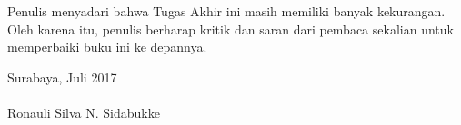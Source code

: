   \indent Penulis menyadari bahwa Tugas Akhir ini masih memiliki banyak kekurangan. Oleh karena itu, penulis berharap kritik dan saran dari pembaca sekalian untuk memperbaiki buku ini ke depannya.

  \hfill Surabaya, Juli 2017 \\ \\ 


  \hfill Ronauli Silva N. Sidabukke

\cleardoublepage %

